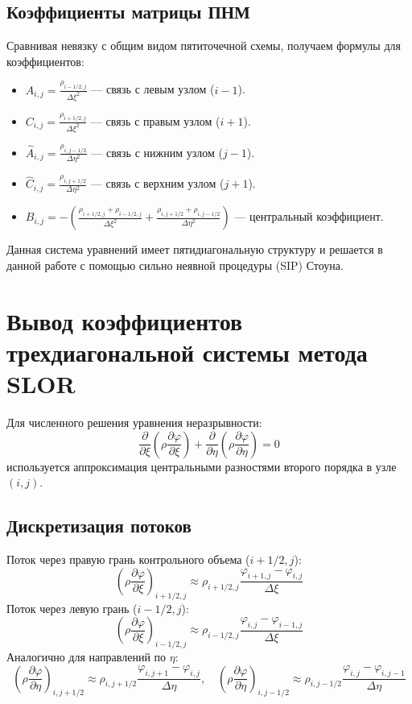 \subsection{Коэффициенты матрицы ПНМ}

Сравнивая невязку с общим видом пятиточечной схемы, получаем формулы для коэффициентов:
\begin{itemize}
	\item $A_{i,j} = \displaystyle \frac{\rho_{i-1/2,j}}{\Delta \xi^2}$ — связь с левым узлом ($i-1$).
	\item $C_{i,j} = \displaystyle \frac{\rho_{i+1/2,j}}{\Delta \xi^2}$ — связь с правым узлом ($i+1$).
	\item $\hat{A}_{i,j} = \displaystyle \frac{\rho_{i,j-1/2}}{\Delta \eta^2}$ — связь с нижним узлом ($j-1$).
	\item $\hat{C}_{i,j} = \displaystyle \frac{\rho_{i,j+1/2}}{\Delta \eta^2}$ — связь с верхним узлом ($j+1$).
	\item $B_{i,j} = \displaystyle -\left( \frac{\rho_{i+1/2,j} + \rho_{i-1/2,j}}{\Delta \xi^2} + \frac{\rho_{i,j+1/2} + \rho_{i,j-1/2}}{\Delta \eta^2} \right)$ — центральный коэффициент.
\end{itemize}

Данная система уравнений имеет пятидиагональную структуру и решается в данной работе с помощью сильно неявной процедуры (SIP) Стоуна.

\section{Вывод коэффициентов трехдиагональной системы метода SLOR}
\label{sec:slor_derivation}

Для численного решения уравнения неразрывности:
\[
\frac{\partial}{\partial \xi} \left( \rho \frac{\partial \varphi}{\partial \xi} \right) + \frac{\partial}{\partial \eta} \left( \rho \frac{\partial \varphi}{\partial \eta} \right) = 0
\]
используется аппроксимация центральными разностями второго порядка в узле $(i, j)$.

\subsection{Дискретизация потоков}

Поток через правую грань контрольного объема ($i+1/2, j$):
\[
\left( \rho \frac{\partial \varphi}{\partial \xi} \right)_{i+1/2, j} \approx \rho_{i+1/2, j} \frac{\varphi_{i+1, j} - \varphi_{i, j}}{\Delta \xi}
\]
Поток через левую грань ($i-1/2, j$):
\[
\left( \rho \frac{\partial \varphi}{\partial \xi} \right)_{i-1/2, j} \approx \rho_{i-1/2, j} \frac{\varphi_{i, j} - \varphi_{i-1, j}}{\Delta \xi}
\]
Аналогично для направлений по $\eta$:
\[
\left( \rho \frac{\partial \varphi}{\partial \eta} \right)_{i, j+1/2} \approx \rho_{i, j+1/2} \frac{\varphi_{i, j+1} - \varphi_{i, j}}{\Delta \eta}, \quad \left( \rho \frac{\partial \varphi}{\partial \eta} \right)_{i, j-1/2} \approx \rho_{i, j-1/2} \frac{\varphi_{i, j} - \varphi_{i, j-1}}{\Delta \eta}
\]

